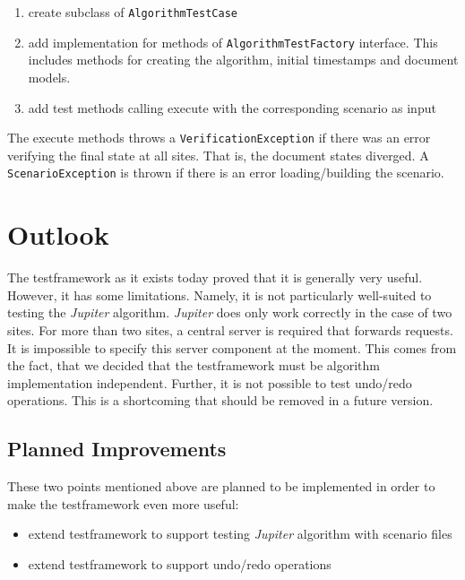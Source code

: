 \documentclass[11pt,a4paper]{article}
\begin{document}
\begin{enumerate}
 \item create subclass of \texttt{AlgorithmTestCase}
 \item add implementation for methods of \texttt{AlgorithmTestFactory} interface. This includes methods for creating the algorithm, initial timestamps and document models.
 \item add test methods calling execute with the corresponding scenario as input
\end{enumerate} 

The execute methods throws a \texttt{VerificationException} if there was an error verifying the final state at all sites. That is, the document states diverged. A \texttt{ScenarioException} is thrown if there is an error loading/building the scenario.


\section{Outlook}
The testframework as it exists today proved that it is generally very useful. However, it has some limitations. Namely, it is not particularly well-suited to testing the \emph{Jupiter} algorithm. \emph{Jupiter} does only work correctly in the case of two sites. For more than two sites, a central server is required that forwards requests. It is impossible to specify this server component at the moment. This comes from the fact, that we decided that the testframework must be algorithm implementation independent. Further, it is not possible to test undo/redo operations. This is a shortcoming that should be removed in a future version.

\subsection{Planned Improvements}
These two points mentioned above are planned to be implemented in order to make the testframework even more useful:

\begin{itemize}
 \item extend testframework to support testing \emph{Jupiter} algorithm with scenario files
 \item extend testframework to support undo/redo operations
\end{itemize}
\end{document}
